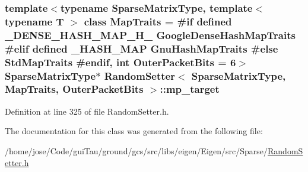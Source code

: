 \hypertarget{class_random_setter_afa6596e02bd8d3d1b84096a73a3b14a7}{
\subsubsection[{mp\-\_\-target}]{\setlength{\rightskip}{0pt plus 5cm}template$<$typename Sparse\-Matrix\-Type, template$<$ typename T $>$ class Map\-Traits = \#if defined \-\_\-\-D\-E\-N\-S\-E\-\_\-\-H\-A\-S\-H\-\_\-\-M\-A\-P\-\_\-\-H\-\_\- Google\-Dense\-Hash\-Map\-Traits \#elif defined \-\_\-\-H\-A\-S\-H\-\_\-\-M\-A\-P Gnu\-Hash\-Map\-Traits \#else Std\-Map\-Traits \#endif, int Outer\-Packet\-Bits = 6$>$ Sparse\-Matrix\-Type$\ast$ {\bf Random\-Setter}$<$ Sparse\-Matrix\-Type, Map\-Traits, Outer\-Packet\-Bits $>$\-::mp\-\_\-target\hspace{0.3cm}{\ttfamily [protected]}}}\label{class_random_setter_afa6596e02bd8d3d1b84096a73a3b14a7}


Definition at line 325 of file Random\-Setter.\-h.



The documentation for this class was generated from the following file\-:\begin{DoxyCompactItemize}
\item 
/home/jose/\-Code/gui\-Tau/ground/gcs/src/libs/eigen/\-Eigen/src/\-Sparse/\hyperlink{_random_setter_8h}{Random\-Setter.\-h}\end{DoxyCompactItemize}
